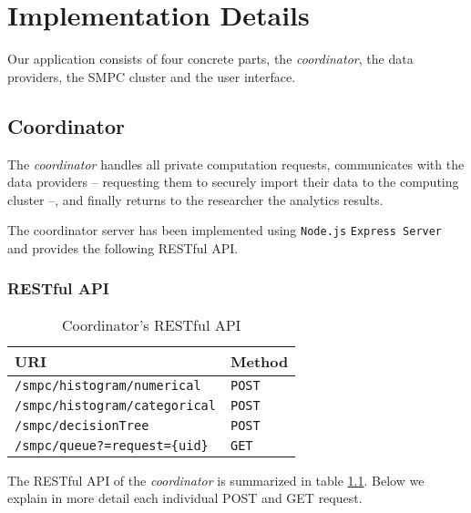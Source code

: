 \chapter{Implementation Details}\label{c:implementation}

Our application consists of four concrete parts, the \textit{coordinator}, the data providers, the SMPC cluster and the user interface.

\section{Coordinator}\label{s:impl-coordinator}
The \textit{coordinator} handles all private computation requests, communicates with the data providers -- requesting them to securely import their data to the computing cluster --, and finally returns to the researcher the analytics results.

The coordinator server has been implemented using \texttt{Node.js} \texttt{Express Server} and provides the following RESTful API.


\subsection{RESTful API}\label{ss:coord-restful-api}

\begin{table}[H]
\centering
\caption{Coordinator's RESTful API}
\label{t:coordinator-api}
\begin{tabular}{@{}ll@{}}
\toprule
URI                                   & Method        \\ \midrule
\texttt{/smpc/histogram/numerical}    & \texttt{POST} \\
\texttt{/smpc/histogram/categorical}  & \texttt{POST} \\
\texttt{/smpc/decisionTree}           & \texttt{POST} \\
\texttt{/smpc/queue?=request=\{uid\}} & \texttt{GET}  \\ \bottomrule
\end{tabular}
\end{table}

The RESTful API of the \textit{coordinator} is summarized in table \ref{t:coordinator-api}.
Below we explain in more detail each individual POST and GET request.

